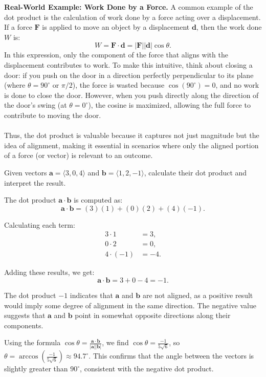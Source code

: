 \noindent \textbf{Real-World Example: Work Done by a Force.} A common example of the dot product is the calculation of work done by a force acting over a displacement. If a force \( \mathbf{F} \) is applied to move an object by a displacement \( \mathbf{d} \), then the work done \( W \) is:
\[
W = \mathbf{F} \cdot \mathbf{d} = |\mathbf{F}| |\mathbf{d}| \cos \theta.
\]
In this expression, only the component of the force that aligns with the displacement contributes to work. To make this intuitive, think about closing a door: if you push on the door in a direction perfectly perpendicular to its plane (where \( \theta = 90^\circ \) or \( \pi/2 \)), the force is wasted because \( \cos(90^\circ) = 0 \), and no work is done to close the door. However, when you push directly along the direction of the door’s swing (at \( \theta = 0^\circ \)), the cosine is maximized, allowing the full force to contribute to moving the door. \\ \\ Thus, the dot product is valuable because it captures not just magnitude but the idea of alignment, making it essential in scenarios where only the aligned portion of a force (or vector) is relevant to an outcome.

\exampleline
\begin{example}
Given vectors \( \mathbf{a} = \langle 3, 0, 4 \rangle \) and \( \mathbf{b} = \langle 1, 2, -1 \rangle \), calculate their dot product and interpret the result.

\begin{solution}
The dot product \( \mathbf{a} \cdot \mathbf{b} \) is computed as:
\[
\mathbf{a} \cdot \mathbf{b} = (3)(1) + (0)(2) + (4)(-1).
\]

Calculating each term:
\begin{align*}
    3 \cdot 1 &= 3, \\
    0 \cdot 2 &= 0, \\
    4 \cdot (-1) &= -4.
\end{align*}

Adding these results, we get:
\[
\mathbf{a} \cdot \mathbf{b} = 3 + 0 - 4 = -1.
\]

The dot product \( -1 \) indicates that \( \mathbf{a} \) and \( \mathbf{b} \) are not aligned, as a positive result would imply some degree of alignment in the same direction. The negative value suggests that \( \mathbf{a} \) and \( \mathbf{b} \) point in somewhat opposite directions along their components.

Using the formula \( \cos\theta = \frac{\mathbf{a} \cdot \mathbf{b}}{|\mathbf{a}||\mathbf{b}|} \), we find \( \cos\theta = \frac{-1}{5\sqrt{6}} \), so \( \theta = \arccos\left(\frac{-1}{5\sqrt{6}}\right) \approx 94.7^\circ \). This confirms that the angle between the vectors is slightly greater than \( 90^\circ \), consistent with the negative dot product.

\end{solution}
\end{example}
\exampleline



